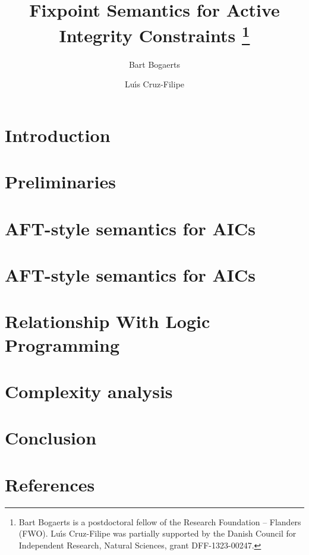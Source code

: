 \documentclass[3p,number,authoryear]{elsarticle}
\title{Fixpoint Semantics for Active Integrity Constraints%
\thanks{Bart Bogaerts is a postdoctoral fellow of the Research Foundation -- Flanders (FWO).
Lu\'\i s Cruz-Filipe was partially supported by the Danish Council for Independent Research, Natural Sciences, grant DFF-1323-00247.}
}
\author[kul]{Bart Bogaerts\corref{cor1}} \ead{bart.bogaerts@cs.kuleuven.be}
\author[sdu]{Lu\'\i s Cruz-Filipe} \ead{lcfilipe@gmail.com}
\begin{document}


\maketitle

\section{Introduction}


\section{Preliminaries}


\section{AFT-style semantics for AICs}


\section{AFT-style semantics for AICs}


\section{Relationship With Logic Programming}


\section{Complexity analysis}



\section{Conclusion}


\newpage
\section*{References}


\end{document}
